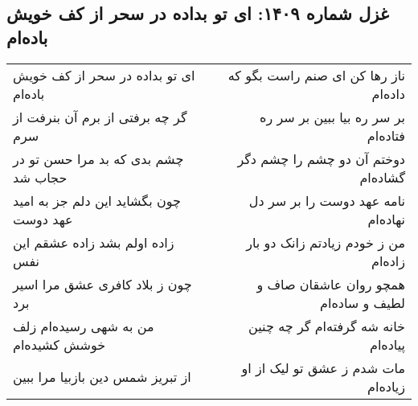 \begin{center}
\section*{غزل شماره ۱۴۰۹: ای تو بداده در سحر از کف خویش باده‌ام}
\label{sec:1409}
\begin{longtable}{l p{0.5cm} r}
ای تو بداده در سحر از کف خویش باده‌ام
&&
ناز رها کن ای صنم راست بگو که داده‌ام
\\
گر چه برفتی از برم آن بنرفت از سرم
&&
بر سر ره بیا ببین بر سر ره فتاده‌ام
\\
چشم بدی که بد مرا حسن تو در حجاب شد
&&
دوختم آن دو چشم را چشم دگر گشاده‌ام
\\
چون بگشاید این دلم جز به امید عهد دوست
&&
نامه عهد دوست را بر سر دل نهاده‌ام
\\
زاده اولم بشد زاده عشقم این نفس
&&
من ز خودم زیادتم زانک دو بار زاده‌ام
\\
چون ز بلاد کافری عشق مرا اسیر برد
&&
همچو روان عاشقان صاف و لطیف و ساده‌ام
\\
من به شهی رسیده‌ام زلف خوشش کشیده‌ام
&&
خانه شه گرفته‌ام گر چه چنین پیاده‌ام
\\
از تبریز شمس دین بازبیا مرا ببین
&&
مات شدم ز عشق تو لیک از او زیاده‌ام
\\
\end{longtable}
\end{center}
